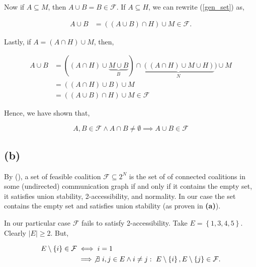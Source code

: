 \documentclass[american]{scrartcl}
\newcommand{\set}[1]{\left\{#1\right\}}
\newcommand{\abs}[1]{\left\lvert #1 \right\rvert}
\begin{document}
Now if $A \subseteq M$, then $A \cup B = B \in \mathcal{F}$. If $A \subseteq H$, we can rewrite (\ref{gen_set}) as,

\begin{equation}
    \begin{split}
        A \cup B &= ((A \cup B) \cap H) \cup M \in \mathcal{F}.
    \end{split}
\end{equation}

Lastly, if $A = (A \cap H) \cup M$, then,

\begin{equation}
    \begin{split}
        A \cup B &= ((A \cap H) \cup \underbrace{M \cup B}_{B}) \cap \underbrace{((A \cap H) \cup M \cup H)}_{N}) \cup M \\
        &= ((A \cap H) \cup B) \cup M \\
        &= ((A \cup B) \cap H) \cup M \in \mathcal{F}
    \end{split}
\end{equation}

Hence, we have shown that,

\begin{equation}
    A, B \in \mathcal{F} \land A \cap B \neq \emptyset \implies A \cup B \in \mathcal{F}
\end{equation}

\subsection*{(b)}

By \citeauthor{brink} (\citeyear{brink}), a set of feasible coalition $\mathcal{F} \subseteq 2^N$ is the set of of connected coalitions in some (undirected) communication graph if and only if it contains the empty set, it satisfies union stability, 2-accessibility, and normality. In our case the set contains the empty set and satisfies union stability (as proven in \textbf{(a)}).

In our particular case $\mathcal{F}$ fails to satisfy 2-accessibility. Take $E = \set{1, 3, 4, 5}$. Clearly $\abs{E} \geq 2$. But,

\begin{equation}
    \begin{split}
        E \setminus \set{i} \in \mathcal{F} &\iff i = 1  \\
        &\implies \not\exists \ i, j \in E \land i \neq j: \ E \setminus \set{i}, E \setminus \set{j} \in \mathcal{F}.
    \end{split}
\end{equation}

\newpage
\printbibliography
\end{document}
